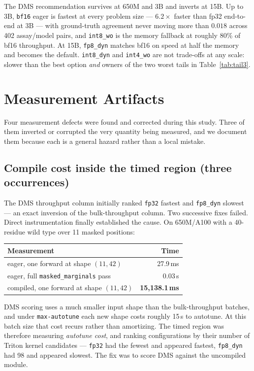 \documentclass[11pt]{article}
\newcommand{\cfg}[1]{\texttt{#1}}
\newcommand{\best}[1]{\textbf{#1}}
\begin{document}
The DMS recommendation survives at 650M and 3B and inverts at 15B. Up to 3B,
\cfg{bf16} eager is fastest at every problem size --- $6.2\times$ faster than
fp32 end-to-end at 3B --- with ground-truth agreement never moving more than
$0.018$ across 402 assay/model pairs, and \cfg{int8\_wo} is the memory fallback
at roughly 80\% of bf16 throughput. At 15B, \cfg{fp8\_dyn} matches bf16 on speed at
half the memory and becomes the default. \cfg{int8\_dyn} and \cfg{int4\_wo} are
not trade-offs at any scale: slower than the best option \emph{and} owners of
the two worst tails in Table~\ref{tab:tail3}.

\section{Measurement Artifacts}

Four measurement defects were found and corrected during this study. Three of
them inverted or corrupted the very quantity being measured, and we document
them because each is a general hazard rather than a local mistake.

\subsection{Compile cost inside the timed region (three occurrences)}

The DMS throughput column initially ranked \cfg{fp32} fastest and \cfg{fp8\_dyn}
slowest --- an exact inversion of the bulk-throughput column. Two successive
fixes failed. Direct instrumentation finally established the cause. On
650M/A100 with a 40-residue wild type over 11 masked positions:

\begin{table}[htb]
\centering
\small
\begin{tabular}{lr}
\toprule
Measurement & Time \\
\midrule
eager, one forward at shape $(11, 42)$        & 27.9\,ms \\
eager, full \texttt{masked\_marginals} pass   & 0.03\,s \\
compiled, one forward at shape $(11, 42)$     & \best{15{,}138.1\,ms} \\
\bottomrule
\end{tabular}
\end{table}

DMS scoring uses a much smaller input shape than the bulk-throughput batches,
and under \texttt{max-autotune} each new shape costs roughly 15\,s to autotune.
At this batch size that cost recurs rather than amortizing. The timed region was
therefore measuring \emph{autotune cost}, and ranking configurations by their
number of Triton kernel candidates --- \cfg{fp32} had the fewest and appeared
fastest, \cfg{fp8\_dyn} had 98 and appeared slowest. The fix was to score DMS
against the uncompiled module.
\end{document}
